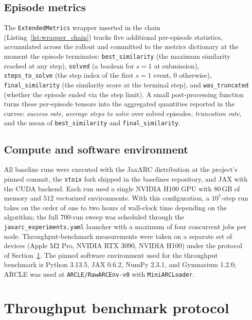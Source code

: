 \subsection{Episode metrics}
\label{app:episode_metrics}

The \texttt{ExtendedMetrics} wrapper inserted in the chain (Listing~\ref{lst:wrapper_chain}) tracks five additional per-episode statistics, accumulated across the rollout and committed to the metrics dictionary at the moment the episode terminates: \texttt{best\_similarity} (the maximum similarity reached at any step), \texttt{solved} (a boolean for $s=1$ at submission), \texttt{steps\_to\_solve} (the step index of the first $s=1$ event, $0$ otherwise), \texttt{final\_similarity} (the similarity score at the terminal step), and \texttt{was\_truncated} (whether the episode ended via the step limit). A small post-processing function turns these per-episode tensors into the aggregated quantities reported in the curves: \emph{success rate}, \emph{average steps to solve} over solved episodes, \emph{truncation rate}, and the mean of \texttt{best\_similarity} and \texttt{final\_similarity}.

\subsection{Compute and software environment}
\label{app:compute_env}

All baseline runs were executed with the JaxARC distribution at the project's pinned commit, the \texttt{stoix} fork shipped in the baselines repository, and JAX with the CUDA backend. Each run used a single NVIDIA H100 GPU with 80\,GB of memory and $512$ vectorized environments. With this configuration, a $10^7$-step run takes on the order of one to two hours of wall-clock time depending on the algorithm; the full $700$-run sweep was scheduled through the \texttt{jaxarc\_experiments.yaml} launcher with a maximum of four concurrent jobs per node. Throughput-benchmark measurements were taken on a separate set of devices (Apple M2 Pro, NVIDIA RTX 3090, NVIDIA H100) under the protocol of Section~\ref{app:throughput}. The pinned software environment used for the throughput benchmark is Python 3.13.5, JAX 0.6.2, NumPy 2.3.1, and Gymnasium 1.2.0; ARCLE was used at \texttt{ARCLE/RawARCEnv-v0} with \texttt{MiniARCLoader}.

\section{Throughput benchmark protocol}
\label{app:throughput}

